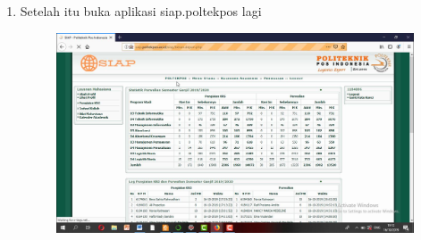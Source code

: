 \begin{enumerate}
\begin{enumerate}
\begin{enumerate}
\begin{enumerate}
\begin{enumerate}
\begin{enumerate}
\begin{enumerate}
\begin{figure}[h]
    \caption{}
    \label{fig:my_label}
\end{figure}
\item  Setelah itu buka aplikasi siap.poltekpos lagi
\begin{figure}[h]
    \centering
    \includegraphics[scale=0.2]{gambar/43.png}
    \caption{}
    \label{fig:my_label}
\end{figure}

\end{enumerate}
\end{enumerate}
\end{enumerate}
\end{enumerate}
\end{enumerate}
\end{enumerate}
\end{enumerate}
